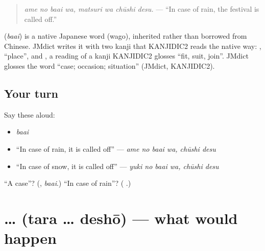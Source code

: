 \begin{quote}
\textbf{  }
\end{quote}

\begin{quote}
\emph{ame no baai wa, matsuri wa chūshi desu.} — \textquotedblleft{}In case of rain, the festival is called off.\textquotedblright{}
\end{quote}

\begin{cousinweb}
\textbf{} (\emph{baai}) is a native Japanese word (wago), inherited rather than borrowed from Chinese. JMdict writes it with two kanji that KANJIDIC2 reads the native way: , \textquotedblleft{}place\textquotedblright{}, and , a reading of a kanji KANJIDIC2 glosses \textquotedblleft{}fit, suit, join\textquotedblright{}. JMdict glosses the word \textquotedblleft{}case; occasion; situation\textquotedblright{} (JMdict, KANJIDIC2).
\end{cousinweb}

\subsection*{Your turn}
Say these aloud:

\begin{itemize}
\raggedright
  \item \emph{baai}
  \item \textquotedblleft{}In case of rain, it is called off\textquotedblright{} — \emph{ame no baai wa, chūshi desu}
  \item \textquotedblleft{}In case of snow, it is called off\textquotedblright{} — \emph{yuki no baai wa, chūshi desu}
\end{itemize}

\begin{tcolorbox}[breakable,colback=teal!4,colframe=teal!35!black,title={Before you move on}]
\textquotedblleft{}A case\textquotedblright{}? (\textbf{}, \emph{baai}.) \textquotedblleft{}In case of rain\textquotedblright{}? (\textbf{ }.)
\end{tcolorbox}
\section[\texorpdfstring{\ja{〜}\ja{たら} … \ja{でしょう} (tara … deshō)}{〜たら … でしょう (tara … deshō)}]{ …  (tara … deshō) — what would happen}

